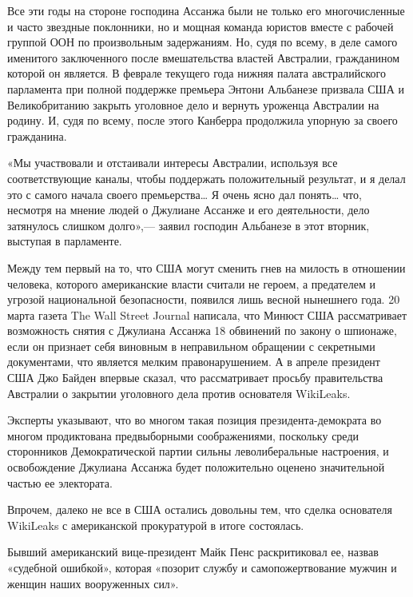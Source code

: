 Все эти годы на стороне господина Ассанжа были не только его многочисленные и часто звездные поклонники, но и мощная команда юристов вместе с рабочей группой ООН по произвольным задержаниям. Но, судя по всему,  в деле самого именитого заключенного  после вмешательства властей Австралии, гражданином которой он является. В феврале текущего года нижняя палата австралийского парламента при полной поддержке премьера Энтони Альбанезе призвала США и Великобританию закрыть уголовное дело и вернуть уроженца Австралии на родину. И, судя по всему, после этого Канберра продолжила упорную  за своего гражданина.

«Мы участвовали и отстаивали интересы Австралии, используя все соответствующие каналы, чтобы поддержать положительный результат, и я делал это с самого начала своего премьерства… Я очень ясно дал понять… что, несмотря на мнение людей о Джулиане Ассанже и его деятельности, дело затянулось слишком долго»,--- заявил господин Альбанезе в этот вторник, выступая в парламенте.

Между тем первый  на то, что США могут сменить гнев на милость в отношении человека, которого американские власти считали не героем, а предателем и угрозой национальной безопасности, появился лишь весной нынешнего года. 20 марта газета The Wall Street Journal написала, что Минюст США рассматривает возможность снятия с Джулиана Ассанжа 18 обвинений по закону о шпионаже, если он признает себя виновным в неправильном обращении с секретными документами, что является мелким правонарушением. А в апреле президент США Джо Байден впервые сказал, что рассматривает просьбу правительства Австралии о закрытии уголовного дела против основателя WikiLeaks.

Эксперты указывают, что во многом такая позиция президента-демократа во многом продиктована предвыборными соображениями, поскольку среди сторонников Демократической партии сильны леволиберальные настроения, и освобождение Джулиана Ассанжа будет положительно оценено значительной частью ее электората.

Впрочем, далеко не все в США остались довольны тем, что сделка основателя WikiLeaks с американской прокуратурой в итоге состоялась.

\begin{fancyquotes}
    Бывший американский вице-президент Майк Пенс раскритиковал ее, назвав «судебной ошибкой», которая «позорит службу и самопожертвование мужчин и женщин наших вооруженных сил».
\end{fancyquotes}

